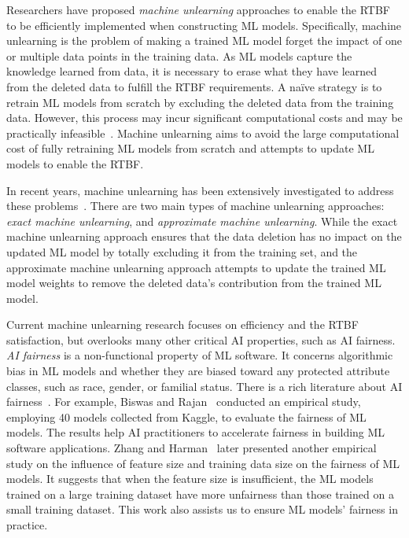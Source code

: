 Researchers have proposed \textit{machine unlearning} approaches to enable the RTBF to be efficiently implemented when constructing ML models. Specifically, machine unlearning is the problem of making a trained ML model forget the impact of
one or multiple data points in the training data. As ML models 
capture the knowledge learned from data, 
it is necessary to
erase what they have learned from the deleted data to fulfill the RTBF requirements. A na\"ive strategy is to retrain ML models from scratch by excluding the deleted data from the training data. However, this process may incur significant computational costs and may be practically infeasible~\cite{thompson2020computational}. Machine unlearning aims to avoid the large computational cost of fully retraining ML models from scratch and attempts to update ML models to enable the RTBF. 


In recent years, machine unlearning has been extensively investigated to
address these problems~\cite{towards-unlearning, baumhauer2022machine, sisa, golatkar2020forgetting, lifelong, amnesiac}. There are two main types of machine unlearning approaches: \textit{exact machine unlearning}, and \textit{approximate machine unlearning}. While the exact machine unlearning approach ensures that the data deletion has no impact on the updated ML model by totally excluding it from the training set, and the approximate machine unlearning approach attempts to update the trained ML model weights to remove the deleted data's contribution from the trained ML model. 

Current machine unlearning research focuses on efficiency and the RTBF satisfaction, but overlooks many other critical AI properties, such as AI fairness.
\textit{AI fairness} is a non-functional property of ML software. It concerns algorithmic bias in ML models and whether they are biased toward any protected attribute classes, such as race, gender, or familial status. There is a rich literature about AI fairness~\cite{fairness-re, RE-AI, fairness-survey, fairness-testing, zhang2021ignorance, biswas2020machine, dwork2012fairness, chakraborty2020fairway}. For example, Biswas and Rajan~\cite{biswas2020machine} conducted an empirical study, employing 40 models collected from Kaggle, to evaluate the fairness of ML models. The results help AI practitioners to accelerate fairness in building ML software applications. Zhang and Harman~\cite{zhang2021ignorance} later presented another empirical study on the influence of feature size and training data size on the fairness of ML models. It suggests that when the feature size is insufficient, the ML models trained on a large training dataset have more unfairness than those trained on a small training dataset. This work also assists us to ensure ML models' fairness in practice. 

